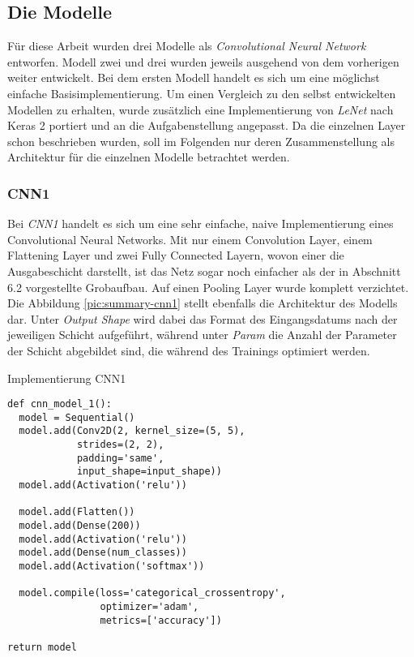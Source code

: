 \subsection{Die Modelle}
Für diese Arbeit wurden drei Modelle als \textit{Convolutional Neural Network} entworfen. Modell zwei und drei wurden jeweils ausgehend von dem vorherigen weiter entwickelt. Bei dem ersten Modell handelt es sich um eine möglichst einfache Basisimplementierung. Um einen Vergleich zu den selbst entwickelten Modellen zu erhalten, wurde zusätzlich eine Implementierung von \textit{LeNet} \cite{kaggle-lenet} nach Keras 2 portiert und an die Aufgabenstellung angepasst.
Da die einzelnen Layer schon beschrieben wurden, soll im Folgenden nur deren Zusammenstellung als Architektur für die einzelnen Modelle betrachtet werden.
 
\subsubsection{CNN1}
Bei \textit{CNN1} handelt es sich um eine sehr einfache, naive Implementierung eines Convolutional Neural Networks. Mit nur einem Convolution Layer, einem Flattening Layer und zwei Fully Connected Layern, wovon einer die Ausgabeschicht darstellt, ist das Netz sogar noch einfacher als der in Abschnitt 6.2 vorgestellte Grobaufbau. Auf einen Pooling Layer wurde komplett verzichtet. 
Die Abbildung \ref{pic:summary-cnn1} stellt ebenfalls die Architektur des Modells dar. Unter \textit{Output Shape} wird dabei das Format des Eingangsdatums nach der jeweiligen Schicht aufgeführt, während unter \textit{Param} die Anzahl der Parameter der Schicht abgebildet sind, die während des Trainings optimiert werden.

\begin{listing} [H]
	\caption{Implementierung CNN1}
	\label{lst:cnn1}
	\begin{verbatim}
def cnn_model_1():
  model = Sequential()
  model.add(Conv2D(2, kernel_size=(5, 5), 
            strides=(2, 2),
            padding='same',
            input_shape=input_shape))
  model.add(Activation('relu'))

  model.add(Flatten())
  model.add(Dense(200))
  model.add(Activation('relu'))
  model.add(Dense(num_classes))
  model.add(Activation('softmax'))

  model.compile(loss='categorical_crossentropy',
                optimizer='adam',
                metrics=['accuracy'])

return model
	\end{verbatim}
\end{listing} 

